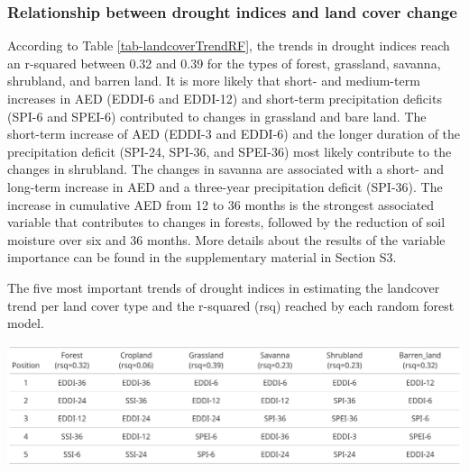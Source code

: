 \documentclass[
  authoryear,
  preprint,
  3p,
  onecolumn]{elsarticle}
\begin{document}
\hypertarget{relationship-between-drought-indices-and-land-cover-change}{%
\subsubsection{Relationship between drought indices and land cover
change}\label{relationship-between-drought-indices-and-land-cover-change}}

According to Table \ref{tab-landcoverTrendRF}, the trends in drought
indices reach an r-squared between 0.32 and 0.39 for the types of
forest, grassland, savanna, shrubland, and barren land. It is more
likely that short- and medium-term increases in AED (EDDI-6 and EDDI-12)
and short-term precipitation deficits (SPI-6 and SPEI-6) contributed to
changes in grassland and bare land. The short-term increase of AED
(EDDI-3 and EDDI-6) and the longer duration of the precipitation deficit
(SPI-24, SPI-36, and SPEI-36) most likely contribute to the changes in
shrubland. The changes in savanna are associated with a short- and
long-term increase in AED and a three-year precipitation deficit
(SPI-36). The increase in cumulative AED from 12 to 36 months is the
strongest associated variable that contributes to changes in forests,
followed by the reduction of soil moisture over six and 36 months. More
details about the results of the variable importance can be found in the
supplementary material in Section S3.

\begin{table}[!ht]
\caption{The five most important trends of drought indices in estimating the landcover trend per land cover type and the r-squared (rsq) reached by each random forest model.}
\label{tab-landcoverTrendRF}
\includegraphics[]{../output/figs/table_importance_trends_landcover_vs_drought.png}
\end{table}
\end{document}
